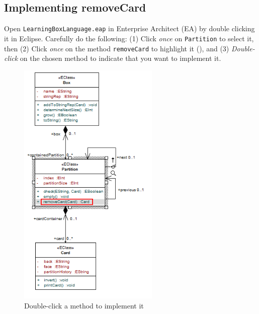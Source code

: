 \newpage
\hypertarget{remCard vis}{}
\subsection{Implementing removeCard}
\genHeader

\begin{stepbystep}

\item Open \texttt{LearningBoxLanguage.eap} in Enterprise Architect (EA) by dou\-ble clicking it in Eclipse. Carefully do the
following: (1) Click \emph{once} on \texttt{Partition} to select it, then (2) Click \emph{once} on the method \texttt{removeCard} to highlight it
(), and (3) \emph{Double-click} on the chosen method to indicate that you want to implement it.

\begin{figure}[htp]
\begin{center}
  \includegraphics[width=0.6\textwidth]{../../org.moflon.doc.handbook.03_storyDiagrams/03_removeCard/visRemImages/ea_startSDM}
  \caption{Double-click a method to implement it}  
  \label{ea:sdm_start}
\end{center}
\end{figure}
 

\end{stepbystep}
